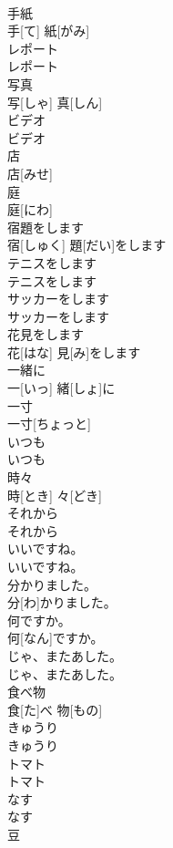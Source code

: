 \documentclass[8pt]{extreport}
\begin{document}
\begin{CJK}{UTF8}{min}
\\	手紙	
\\	手[て] 紙[がみ]		
\\	レポート	
\\	レポート		
\\	写真	
\\	写[しゃ] 真[しん]		
\\	ビデオ	
\\	ビデオ		
\\	店	
\\	店[みせ]		
\\	庭	
\\	庭[にわ]		
\\	宿題をします	
\\	宿[しゅく] 題[だい]をします		
\\	テニスをします	
\\	テニスをします		
\\	サッカーをします	
\\	サッカーをします		
\\	[お]花見をします	
\\	[お] 花[はな] 見[み]をします		
\\	一緒に	
\\	一[いっ] 緒[しょ]に		
\\	一寸	
\\	一寸[ちょっと]		
\\	いつも	
\\	いつも		
\\	時々	
\\	時[とき] 々[どき]		
\\	それから	
\\	それから		
\\	いいですね。	
\\	いいですね。		
\\	分かりました。	
\\	分[わ]かりました。		
\\	何ですか。	
\\	何[なん]ですか。		
\\	じゃ、またあした。	
\\	じゃ、またあした。		
\\	食べ物	
\\	食[た]べ 物[もの]		
\\	きゅうり	
\\	きゅうり		
\\	トマト	
\\	トマト		
\\	なす	
\\	なす		
\\	豆	

\end{CJK}
\end{document}
